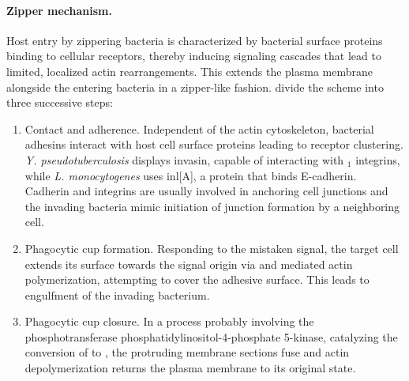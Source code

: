 \paragraph{Zipper mechanism.}
Host entry by zippering bacteria is characterized by bacterial surface proteins binding to cellular receptors, thereby inducing signaling cascades that lead to limited, localized actin rearrangements. This extends the plasma membrane alongside the entering bacteria in a zipper-like fashion. \citeauthor{Cossart2004} divide the scheme into three successive steps:
\begin{enumerate}[label=(\alph*)]
  \item Contact and adherence. Independent of the actin cytoskeleton, bacterial adhesins interact with host cell surface proteins leading to receptor clustering. \textit{Y. pseudotuberculosis} displays invasin, capable of interacting with \textbeta$_1$ integrins, while \textit{L. monocytogenes} uses \acrshort{inl}[A], a protein that binds E-cadherin. Cadherin and integrins are usually involved in anchoring cell junctions and the invading bacteria mimic initiation of junction formation by a neighboring cell.
  \item Phagocytic cup formation. Responding to the mistaken signal, the target cell extends its surface towards the signal origin via  and  mediated actin polymerization, attempting to cover the adhesive surface. This leads to engulfment of the invading bacterium. 
  \item Phagocytic cup closure. In a process probably involving the phosphotransferase phosphatidylinositol-4-phosphate 5-kinase, catalyzing the conversion of  to , the protruding membrane sections fuse and actin depolymerization returns the plasma membrane to its original state.
\end{enumerate}

\label{trigger-mechanism}

